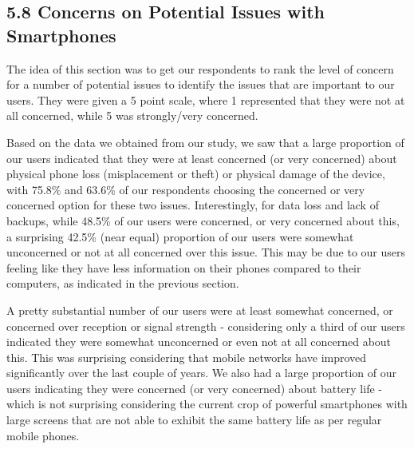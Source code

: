 \documentclass{sigchi}
\begin{document}
\subsection{5.8 Concerns on Potential Issues with Smartphones}

The idea of this section was to get our respondents to rank the level of concern for a number of potential issues to identify the issues that are important to our users. They were given a 5 point scale, where 1 represented that they were not at all concerned, while 5 was strongly/very concerned.

Based on the data we obtained from our study, we saw that a large proportion of our users indicated that they were at least concerned (or very concerned) about physical phone loss (misplacement or theft) or physical damage of the device, with 75.8\% and 63.6\% of our respondents choosing the concerned or very concerned option for these two issues. Interestingly, for data loss and lack of backups, while 48.5\% of our users were concerned, or very concerned about this, a surprising 42.5\% (near equal) proportion of our users were somewhat unconcerned or not at all concerned over this issue. This may be due to our users feeling like they have less information on their phones compared to their computers, as indicated in the previous section.

A pretty substantial number of our users were at least somewhat concerned, or concerned over reception or signal strength - considering only a third of our users indicated they were somewhat unconcerned or even not at all concerned about this. This was surprising considering that mobile networks have improved significantly over the last couple of years. We also had a large proportion of our users indicating they were concerned (or very concerned) about battery life - which is not surprising considering the current crop of powerful smartphones with large screens that are not able to exhibit the same battery life as per regular mobile phones.
\end{document}
